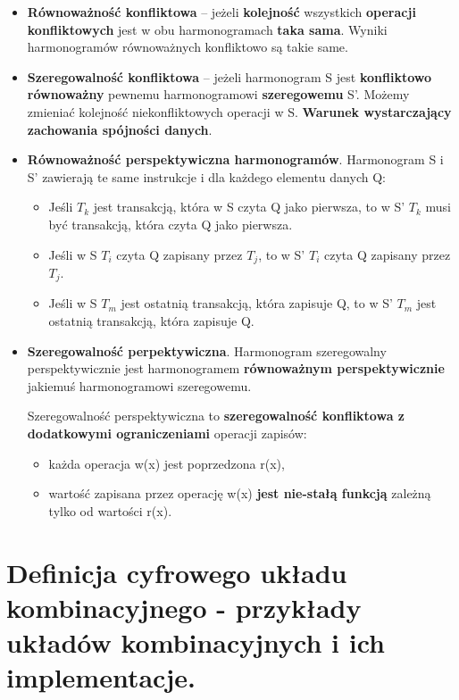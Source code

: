 \documentclass[main.tex]{subfiles}
\begin{document}
    \begin{itemize}
        \item \textbf{Równoważność konfliktowa} -- jeżeli \textbf{kolejność} wszystkich \textbf{operacji konfliktowych}
        jest w obu harmonogramach \textbf{taka sama}. Wyniki harmonogramów równoważnych konfliktowo są takie same.
        \item \textbf{Szeregowalność konfliktowa} -- jeżeli harmonogram S jest \textbf{konfliktowo równoważny} pewnemu
        harmonogramowi \textbf{szeregowemu} S’. Możemy zmieniać kolejność niekonfliktowych operacji w S.
        \textbf{Warunek wystarczający zachowania spójności danych}.\\

        \item \textbf{Równoważność perspektywiczna harmonogramów}. Harmonogram S i S' zawierają te same instrukcje i dla każdego
        elementu danych Q:
        \begin{itemize}
            \item Jeśli $T_k$ jest transakcją, która w
            S czyta Q jako pierwsza, to w S' $T_k$ musi być transakcją, która czyta Q jako pierwsza.
            \item Jeśli w S $T_i$ czyta Q zapisany przez $T_j$, to w S' $T_i$ czyta Q zapisany przez $T_j$.
            \item Jeśli w S  $T_m$ jest ostatnią transakcją, która
            zapisuje Q, to w S' $T_m$ jest ostatnią transakcją, która zapisuje Q.
        \end{itemize}

        \item \textbf{Szeregowalność perpektywiczna}. Harmonogram szeregowalny perspektywicznie jest harmonogramem
        \textbf{równoważnym perspektywicznie} jakiemuś harmonogramowi szeregowemu.

        Szeregowalność perspektywiczna to \textbf{szeregowalność konfliktowa z dodatkowymi ograniczeniami} operacji zapisów:
        \begin{itemize}
            \item każda operacja w(x) jest poprzedzona r(x),
            \item wartość zapisana przez operację w(x) \textbf{jest nie-stałą funkcją} zależną tylko od wartości r(x).
        \end{itemize}
    \end{itemize}


    \section{Definicja cyfrowego układu kombinacyjnego - przykłady układów kombinacyjnych i ich implementacje.}
\end{document}
